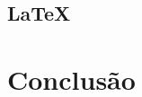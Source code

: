 \documentclass[final,12pt,a4paper]{elsarticle}
\begin{document}
\subsection{\LaTeX}

\section{Conclusão}









\end{document}
